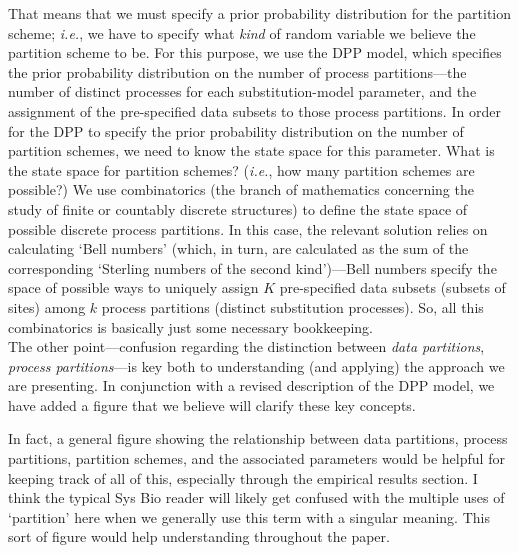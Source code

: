 \documentclass[10pt]{article}
\newcommand{\brmadd}[1]{{\color{blue}{#1}}}
\begin{document}
\begin{flushleft}
{	That means that we must specify a prior probability distribution for the partition scheme; {\it i.e.}, we have to specify what \emph{kind} of random variable we believe the partition scheme to be.  
	For this purpose, we use the DPP model, which specifies the prior probability distribution on the number of process partitions---the number of distinct processes for each substitution-model parameter, and the assignment of the pre-specified data subsets to those process partitions.  
	In order for the DPP to specify the prior probability distribution on the number of partition schemes, we need to know the state space for this parameter.
	What is the state space for partition schemes?  ({\it i.e.}, how many partition schemes are possible?)
	We use combinatorics (the branch of mathematics concerning the study of finite or countably discrete structures) to define the state space of possible discrete process partitions.  
	In this case, the relevant solution relies on calculating `Bell numbers' (which, in turn, are calculated as the sum of the corresponding `Sterling numbers of the second kind')---Bell numbers specify the space of possible ways to uniquely assign $K$ pre-specified data subsets (subsets of sites) among $k$ process partitions (distinct substitution processes).  
	So, all this combinatorics is basically just some necessary bookkeeping.\\
\smallskip
\color{orange}The other point---confusion regarding the distinction between \emph{data partitions}, \emph{process partitions}---is key both to understanding (and applying) the approach we are presenting.  In conjunction with a revised description of the DPP model, we have added a figure that we believe will clarify these key concepts.}  


\medskip
In fact, a general figure showing the relationship between data partitions, process partitions, partition schemes, and the associated parameters would be helpful for keeping track of all of this, especially through the empirical results section.  I think the typical Sys Bio reader will likely get confused with the multiple uses of `partition' here when we generally use this term with a singular meaning.  This sort of figure would help understanding throughout the paper.\\
\brmadd{Done.
	This is a great idea!  
	We have followed this suggestion (see previous response).}


\end{flushleft}
\end{document}
